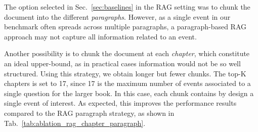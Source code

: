 \documentclass{article}
\begin{document}
 

The option selected in Sec.~\ref{sec:baselines} in the RAG setting was to chunk the document into the different \textit{paragraphs}. 
However,  as a single event in our benchmark   often spreads across multiple paragraphs, a paragraph-based  RAG approach may not capture all information related to an event.

Another possibility is to chunk the document at each \textit{chapter}, which constitute an ideal upper-bound, as in practical cases information would not be so well structured. Using this strategy, we obtain longer but fewer chunks. The top-K chapters is set to 17, since 17 is the maximum number of events associated to a single question for the larger book. In this case, each chunk contains by design a single event of interest. As expected, this improves the performance results compared to the RAG paragraph strategy, as shown in Tab.~\ref{tab:ablation_rag_chapter_paragraph}. 
\end{document}
